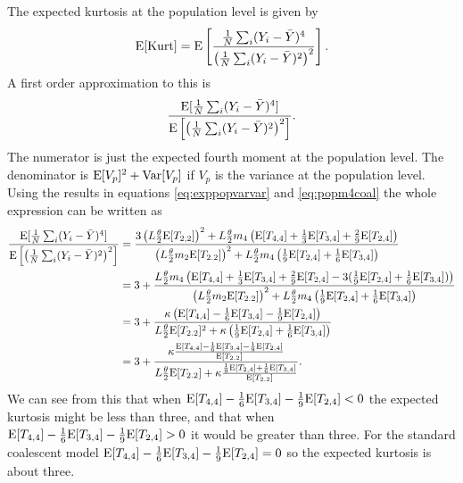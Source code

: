 \newcommand{\AAA}{\E[T_{4,4}] + \frac{1}{3}\E[T_{3,4}] + \frac{2}{9}\E[T_{2,4}]}
\newcommand{\BBB}{\frac{1}{9}\E[T_{2,4}] + \frac{1}{6}\E[T_{3,4}]}
\newcommand{\CCC}{\E[T_{4,4}] - \frac{1}{6}\E[T_{3,4}] - \frac{1}{9}\E[T_{2,4}]}

The expected kurtosis at the population level is given by
\begin{equation}
  \mathrm{E}[\mbox{Kurt}] = \mathrm{E}\left[ \frac{\frac{1}{N}\sum_i(Y_i - \bar{Y})^4}
    {\left(\frac{1}{N}\sum_i(Y_i - \bar{Y})^2  \right)^2} \right].
\end{equation}
A first order approximation to this is
\begin{equation}
  \frac{\mathrm{E}[\frac{1}{N}\sum_i(Y_i - \bar{Y})^4]}
    {\mathrm{E}\left[\left(\frac{1}{N}\sum_i(Y_i - \bar{Y})^2  \right)^2\right]}.
\end{equation}
The numerator is just the expected fourth moment at the population level. The
denominator is $\mathrm{E}[V_p]^2 + \mathrm{Var}[V_p]$ if $V_p$ is the variance at the
population level. Using the results in equations \ref{eq:exppopvarvar} and
\ref{eq:popm4coal} the whole expression can be written as
\begin{align*}
  \frac{\E[\frac{1}{N}\sum_i(Y_i - \bar{Y})^4]}
    {\E\left[\left(\frac{1}{N}\sum_i(Y_i - \bar{Y})^2  \right)^2\right]} &= \frac{3\left(L \T \E[T_{2,2}] \right)^2 + L \T m_4 \left(\AAA\right)}
    {\left( L \T m_2 \E[T_{2.2}]\right)^2 + L \T m_4 \left(\BBB\right)} \nonumber \\
    &= 3 + \frac{L \T m_4 \left( \AAA - 3(\BBB)\right)}
    {\left( L \T m_2 \E[T_{2.2}]\right)^2 + L \T m_4 \left(\BBB\right)} \nonumber \\
    &= 3 + \frac{\kappa \left( \CCC \right)}
    {L \T \E[T_{2.2}]^2 + \kappa \left( \BBB\right)} \nonumber \\
    &= 3 + \frac{\kappa \frac{\CCC}{\E[T_{2.2}]}}
    {L \T \E[T_{2.2}] + \kappa \frac{\BBB}{\E[T_{2.2}]}}.
\end{align*}
We can see from this that when $\CCC < 0$ the expected kurtosis might be less
than three, and that when $\CCC > 0$ it would be greater than three. For the
standard coalescent model $\CCC = 0$ so the expected kurtosis is about three. 

